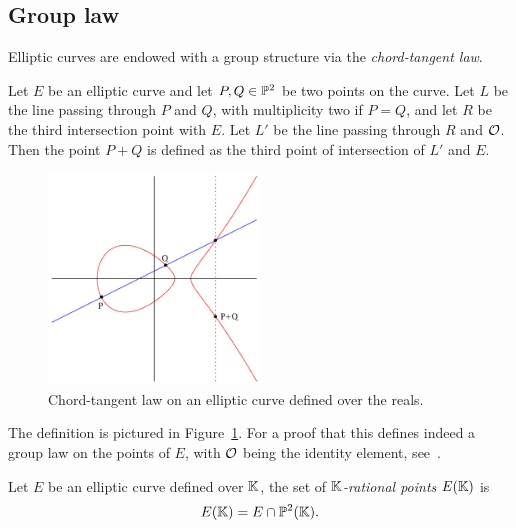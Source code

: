 \subsection{Group law}
\label{sec:group-law}
  Elliptic curves are
endowed with a group structure via the
\emph{chord-tangent law}.

\begin{definition}
  Let $E$ be an elliptic curve and let $P,Q\in\mathbb{P}^2$ be two points
  on the curve. Let $L$ be the line passing through $P$ and $Q$, with
  multiplicity two if $P=Q$, and let $R$ be the third intersection
  point with $E$.  Let $L'$ be the line passing through $R$ and
  $\mathcal{O}$. Then the point $P+Q$ is defined as the third point of
  intersection of $L'$ and $E$.
\end{definition}

\begin{figure}[ht]
  \centering
  \includegraphics[width=0.5\textwidth]{isogeny/ec-add}
  \caption{Chord-tangent law on an elliptic curve defined over the reals.}
  \label{fig:chord-tangent}
\end{figure}

The definition is pictured in Figure~\ref{fig:chord-tangent}. For a
proof that this defines indeed a group law on the points of $E$, with
$\mathcal{O}$ being the identity element, see~\cite[II, $\S2$]{silverman:elliptic}.

\begin{definition}
  Let $E$ be an elliptic curve defined over $\mathbb{K}$, the set of
  \emph{$\mathbb{K}$-rational points} $E(\mathbb{K})$ is 
  \begin{equation}
    \label{eq:119}
    E(\mathbb{K}) = E \cap \mathbb{P}^2(\mathbb{K})
    \text{.}
  \end{equation}
\end{definition}

